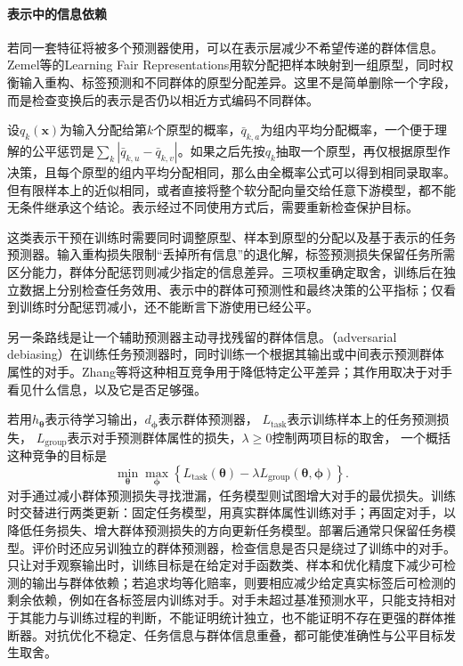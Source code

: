 \paragraph{表示中的信息依赖}

若同一套特征将被多个预测器使用，可以在表示层减少不希望传递的群体信息。Zemel等的Learning Fair Representations用软分配把样本映射到一组原型，同时权衡输入重构、标签预测和不同群体的原型分配差异。这里不是简单删除一个字段，而是检查变换后的表示是否仍以相近方式编码不同群体。

设$q_k(\bm{x})$为输入分配给第$k$个原型的概率，$\bar q_{k,a}$为组内平均分配概率，一个便于理解的公平惩罚是$\sum_k|\bar q_{k,u}-\bar q_{k,v}|$。如果之后先按$q_k$抽取一个原型，再仅根据原型作决策，且每个原型的组内平均分配相同，那么由全概率公式可以得到相同录取率。但有限样本上的近似相同，或者直接将整个软分配向量交给任意下游模型，都不能无条件继承这个结论。表示经过不同使用方式后，需要重新检查保护目标。

这类表示干预在训练时需要同时调整原型、样本到原型的分配以及基于表示的任务预测器。输入重构损失限制“丢掉所有信息”的退化解，标签预测损失保留任务所需区分能力，群体分配惩罚则减少指定的信息差异。三项权重确定取舍，训练后在独立数据上分别检查任务效用、表示中的群体可预测性和最终决策的公平指标；仅看到训练时分配惩罚减小，还不能断言下游使用已经公平。

另一条路线是让一个辅助预测器主动寻找残留的群体信息。（adversarial debiasing）在训练任务预测器时，同时训练一个根据其输出或中间表示预测群体属性的对手。Zhang等将这种相互竞争用于降低特定公平差异；其作用取决于对手看见什么信息，以及它是否足够强。

若用$h_{\bm{\theta}}$表示待学习输出，$d_{\bm{\phi}}$表示群体预测器，
$L_{\mathrm{task}}$表示训练样本上的任务预测损失，
$L_{\mathrm{group}}$表示对手预测群体属性的损失，$\lambda\geq0$控制两项目标的取舍，
一个概括这种竞争的目标是
\[
 \min_{\bm{\theta}}\max_{\bm{\phi}}
 \left\{L_{\mathrm{task}}(\bm{\theta})
       -\lambda L_{\mathrm{group}}(\bm{\theta},\bm{\phi})\right\}.
\]
对手通过减小群体预测损失寻找泄漏，任务模型则试图增大对手的最优损失。训练时交替进行两类更新：固定任务模型，用真实群体属性训练对手；再固定对手，以降低任务损失、增大群体预测损失的方向更新任务模型。部署后通常只保留任务模型。评价时还应另训独立的群体预测器，检查信息是否只是绕过了训练中的对手。只让对手观察输出时，训练目标是在给定对手函数类、样本和优化精度下减少可检测的输出与群体依赖；若追求均等化赔率，则要相应减少给定真实标签后可检测的剩余依赖，例如在各标签层内训练对手。对手未超过基准预测水平，只能支持相对于其能力与训练过程的判断，不能证明统计独立，也不能证明不存在更强的群体推断器。对抗优化不稳定、任务信息与群体信息重叠，都可能使准确性与公平目标发生取舍。

